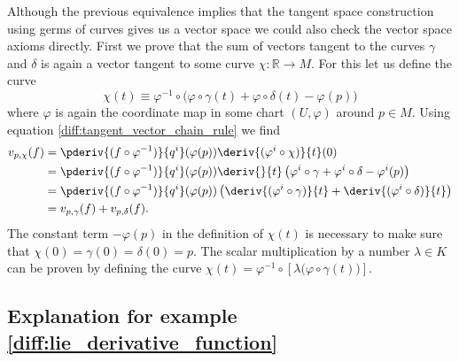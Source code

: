    Although the previous equivalence implies that the tangent space construction using germs of curves gives us a vector space we could also check the vector space axioms directly. First we prove that the sum of vectors tangent to the curves $\gamma$ and $\delta$ is again a vector tangent to some curve $\chi:\mathbb{R}\rightarrow M$. For this let us define the curve \[\chi(t) \equiv \varphi^{-1}\circ\Big(\varphi\circ\gamma(t) + \varphi\circ\delta(t) - \varphi(p)\Big)\] where $\varphi$ is again the coordinate map in some chart $(U, \varphi)$ around $p\in M$. Using equation \ref{diff:tangent_vector_chain_rule} we find
    \begin{align*}
        v_{p, \chi}(f) &= \pderiv{(f\circ\varphi^{-1})}{q^i}(\varphi(p))\deriv{(\varphi^i\circ\chi)}{t}(0)\\
        &=\pderiv{(f\circ\varphi^{-1})}{q^i}(\varphi(p))\deriv{}{t}\left(\varphi^i\circ\gamma + \varphi^i\circ\delta - \varphi^i(p)\right)\\
        &=\pderiv{(f\circ\varphi^{-1})}{q^i}(\varphi(p))\left(\deriv{(\varphi^i\circ\gamma)}{t} + \deriv{(\varphi^i\circ\delta)}{t}\right)\\
        &=v_{p, \gamma}(f) + v_{p, \delta}(f).
    \end{align*}
    The constant term $-\varphi(p)$ in the definition of $\chi(t)$ is necessary to make sure that $\chi(0) = \gamma(0) = \delta(0) = p$. The scalar multiplication by a number $\lambda\in K$ can be proven by defining the curve $\chi(t) = \varphi^{-1}\circ\left[\lambda\Big(\varphi\circ\gamma(t)\Big)\right]$.

\subsection{Explanation for example \ref{diff:lie_derivative_function}}

